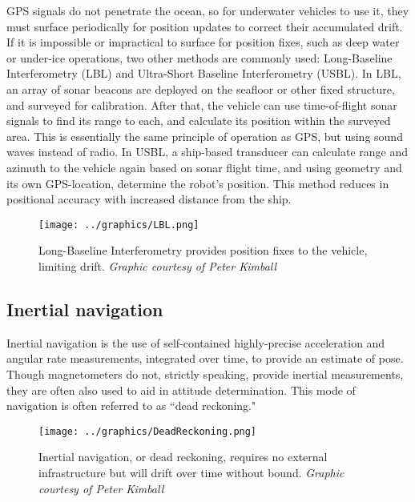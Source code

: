 GPS signals do not penetrate the ocean, so for underwater vehicles to use it, they must surface periodically for position updates to correct their accumulated drift. If it is impossible or impractical to surface for position fixes, such as deep water or under-ice operations, two other methods are commonly used: Long-Baseline Interferometry (LBL) and Ultra-Short Baseline Interferometry (USBL). In LBL, an array of sonar beacons are deployed on the seafloor or other fixed structure, and surveyed for calibration. After that, the vehicle can use time-of-flight sonar signals to find its range to each, and calculate its position within the surveyed area. This is essentially the same principle of operation as GPS, but using sound waves instead of radio. In USBL, a ship-based transducer can calculate range and azimuth to the vehicle again based on sonar flight time, and using geometry and its own GPS-location, determine the robot's position. This method reduces in positional accuracy with increased distance from the ship. 

\begin{figure}[!htb]
   \centering
   \texttt{[image: ../graphics/LBL.png]} %
   \caption{Long-Baseline Interferometry provides position fixes to the vehicle, limiting drift. \emph{Graphic courtesy of Peter Kimball}}
   \label{fig:LBL}
\end{figure}

\subsection{Inertial navigation}

Inertial navigation is the use of self-contained highly-precise acceleration and angular rate measurements, integrated over time, to provide an estimate of pose. Though magnetometers do not, strictly speaking, provide inertial measurements, they are often also used to aid in attitude determination. This mode of navigation is often referred to as ``dead reckoning."

\begin{figure}[!htb]
   \centering
   \texttt{[image: ../graphics/DeadReckoning.png]} %
   \caption{Inertial navigation, or dead reckoning, requires no external infrastructure but will drift over time without bound. \emph{Graphic courtesy of Peter Kimball}}
   \label{fig:inertialNav}
\end{figure}

